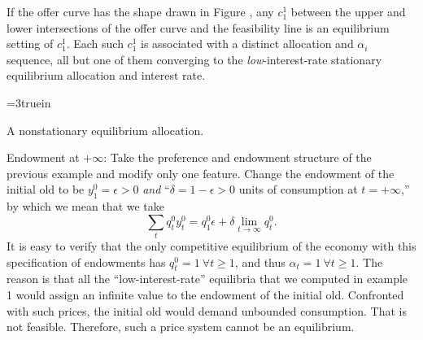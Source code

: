  If the offer curve has the shape drawn in Figure , any %
$c_1^1$ between the upper and lower intersections
of the offer curve and the feasibility line is
an equilibrium setting of $c_1^1$. Each such $c_1^1$ is
associated with a distinct allocation and $\alpha_i$ sequence, all but
one of them converging to the {\it low\/}-interest-rate
 stationary equilibrium allocation and interest rate.



\centerline{\epsfxsize=3truein}
\caption{A nonstationary equilibrium allocation.}
\endfigure

\medskip
{}  \quad  Endowment at $+\infty$:
 Take the preference and endowment structure
of the previous example and modify only one feature. Change the
endowment of the initial old to be  $y^0_1 =\epsilon>0 $ {\it and}
``$\delta=1-\epsilon >0$ units of consumption at $t=+\infty$,''
by which we mean that we take
$$ \sum_t q_t^0 y_t^0 = q_1^0 \epsilon + \delta \lim_{t\rightarrow
   \infty} q_t^0.$$
It is easy to verify that the only competitive equilibrium
of the economy with this specification of endowments
has $q_t^0 = 1 \ \forall t\geq 1$, and thus $\alpha_t = 1
\ \forall t \geq 1$.   The reason is that
  all  the ``low-interest-rate'' equilibria  that we computed in example 1
would assign an infinite value to the endowment
of the initial old.  Confronted with such prices, the
initial old would demand unbounded consumption. That is
not feasible.  Therefore, such a price system cannot be an equilibrium.

